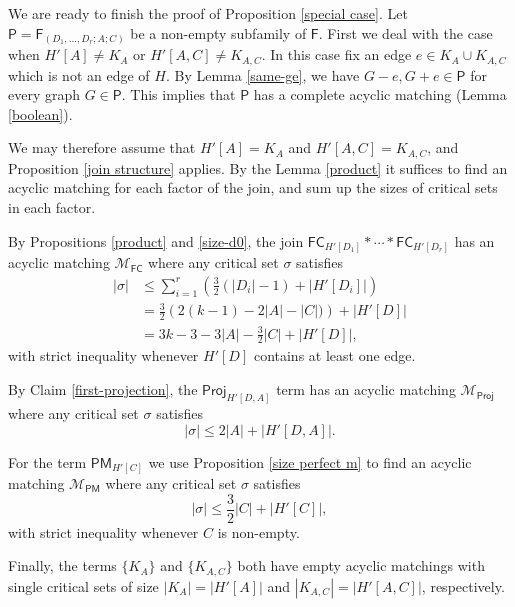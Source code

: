 \documentclass[10pt]{amsart}
\theoremstyle{definition}
\begin{document}
	We are ready to finish the proof of Proposition \ref{special case}. Let $\mathsf{P} = \mathsf{F}_{(D_1, \dots, D_r; A; C)}$ be a non-empty subfamily of $\mathsf{F}$. 
	First we deal with the case when $H'[A] \neq K_A$ or $H'[A,C]\neq K_{A,C}$. In this case fix an edge $e\in K_A\cup K_{A,C}$ which is not an edge of $H$. By Lemma \ref{same-ge}, we have 
	$G-e, G+e \in \mathsf{P}$ for every graph $G\in \mathsf{P}$. This implies that $\mathsf{P}$ has a complete acyclic matching (Lemma \ref{boolean}).
	
	We may therefore assume that $H'[A] = K_A$ and $H'[A,C] = K_{A,C}$, and Proposition \ref{join structure} applies. By the Lemma \ref{product} it suffices to find an acyclic matching for each factor of the join, and sum up the sizes of critical sets in each factor. 
	
	By Propositions \ref{product} and \ref{size-d0}, the join  
	$\mathsf{FC}_{H'[D_1]} * \cdots * \mathsf{FC}_{H'[D_r]}$ has an acyclic  matching $\mathcal{M}_{\mathsf{FC}}$ where any critical set $\sigma$ satisfies
	\begin{align*}
	|\sigma| & \leq \textstyle{\sum_{i=1}^r} \left( \textstyle{\frac{3}{2}} (|D_i| - 1) + |H'[D_i]|\right) \\
	&= \textstyle{\frac{3}{2}} \left( 2(k-1) - 2|A| - |C|) \right) + |H'[D]|\\
	& = 3k-3-3|A|-\textstyle{\frac{3}{2}}|C| + |H'[D]|,
	\end{align*}
	with strict inequality whenever $H'[D]$ contains at least one edge.
	
	By Claim \ref{first-projection},  the  $\mathsf{Proj}_{H'[D,A]}$ term has an acyclic matching $\mathcal{M}_{\mathsf{Proj}}$ where any critical set $\sigma$ satisfies 
	\[|\sigma| \leq 2|A| + |H'[D,A]|.\]
	
	For the term $\mathsf{PM}_{H'[C]}$ we use Proposition \ref{size perfect m} to find an acyclic  matching $\mathcal{M}_{\mathsf{PM}}$ where any critical set $\sigma$ satisfies 
	\[|\sigma| \leq \textstyle{\frac{3}{2}} |C| + |H'[C]|,\]
	with strict inequality whenever $C$ is non-empty. 
	
	Finally, the terms $\{K_A\}$ and $\{K_{A,C}\}$ both have empty acyclic matchings with single critical sets of size $|K_A| = |H'[A]|$ and $|K_{A,C}| = |H'[A,C]|$, respectively.
	
\end{document}

